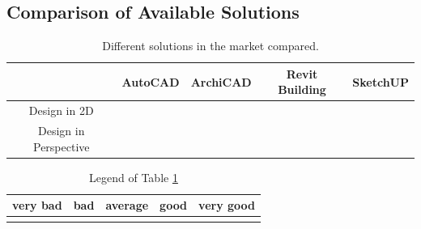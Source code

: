 \subsection{Comparison of Available Solutions}
\begin{table}[!ht]
    \centering
		\begin{tabular}{|c|c|c|c|c|}
			\hline
														& AutoCAD		& ArchiCAD	& Revit Building	& SketchUP	\\
			\hline
			Design in 2D					&		\GdB		&		\GdC		&				\GdD			&		\GdB		\\
			\hline
			Design in Perspective	&		\GdD		&		\GdE		&				\GdA			&		\GdC		\\
			\hline
		\end{tabular}
		\caption{Different solutions in the market compared.}
		\label{TB-COMP-SOL}
\end{table}

\begin{table}[!ht]
    \centering
		\begin{tabular}{|p{2cm}|p{2cm}|p{2cm}|p{2cm}|p{2cm}|}
			\hline
			very bad	& bad			& average	& good		& very good	\\
			\hline
				\GdE		&	\GdD		&	\GdC		&	\GdB		&	\GdA			\\
			\hline
		\end{tabular}
  \caption{Legend of Table \ref{TB-COMP-SOL}}
  \label{TB-COMP-SOL-LEGEND}
\end{table}

